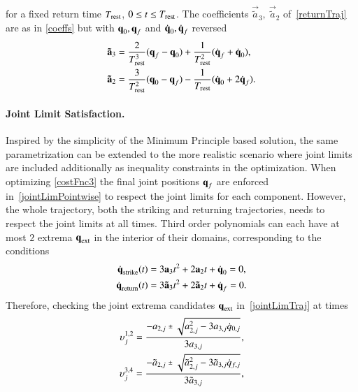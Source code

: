 %
\noindent for a fixed return time $T_{\mathrm{rest}}$, $0 \leq t \leq T_{\mathrm{rest}}$. The coefficients $\vec{\tilde{a}}_3, \  \vec{\tilde{a}}_2$ of~\eqref{returnTraj} are as in \eqref{coeffs} but with $\boldsymbol{\mathrm{q}}_0, \boldsymbol{\mathrm{q}}_f$ and $\dot{\boldsymbol{\mathrm{q}}}_0, \dot{\boldsymbol{\mathrm{q}}}_f$ reversed
%
\begin{align}
\boldsymbol{\mathrm{\tilde{a}}}_3 &= \frac{2}{T_{\mathrm{rest}}^3}(\boldsymbol{\mathrm{q}}_f - \boldsymbol{\mathrm{q}}_0) + \frac{1}{T_{\mathrm{rest}}^2}(\dot{\boldsymbol{\mathrm{q}}}_f + \dot{\boldsymbol{\mathrm{q}}}_0), \\
\boldsymbol{\mathrm{\tilde{a}}}_2 &= \frac{3}{T_{\mathrm{rest}}^2}(\boldsymbol{\mathrm{q}}_0 - \boldsymbol{\mathrm{q}}_f) - \frac{1}{T_{\mathrm{rest}}}(\dot{\boldsymbol{\mathrm{q}}}_0 + 2\dot{\boldsymbol{\mathrm{q}}}_f).
\label{returnCoeffs}
\end{align}
%
\paragraph{\textbf{Joint Limit Satisfaction}.} Inspired by the simplicity of the Minimum Principle based solution, the same parametrization can be extended to the more realistic scenario where joint limits are included additionally as inequality constraints in the optimization.
%
% 
%
When optimizing \eqref{costFnc3} the final joint positions $\boldsymbol{\mathrm{q}}_f$ are enforced in~\eqref{jointLimPointwise} to respect the joint limits for each component. However, the whole trajectory, both the striking and returning trajectories, needs to respect the joint limits at all times. Third order polynomials can each have at most $2$ extrema $\boldsymbol{\mathrm{q}}_{\mathrm{ext}}$ in the interior of their domains, corresponding to the conditions
%
\begin{align}
\dot{\boldsymbol{\mathrm{q}}}_{\mathrm{strike}}(t) &= 3\boldsymbol{\mathrm{a}}_3t^2 + 2\boldsymbol{\mathrm{a}}_2t + \dot{\boldsymbol{\mathrm{q}}}_0 = 0, \\
\dot{\boldsymbol{\mathrm{q}}}_{\mathrm{return}}(t) &= 3\boldsymbol{\mathrm{\tilde{a}}}_3t^2 + 2\boldsymbol{\mathrm{\tilde{a}}}_2t + \dot{\boldsymbol{\mathrm{q}}}_f = 0. 
\end{align}
%
\noindent Therefore, checking the joint extrema candidates  $\boldsymbol{\mathrm{q}}_{\mathrm{ext}}$ in~\eqref{jointLimTraj} at times
%
\begin{align}
\upsilon_{j}^{1,2} = \frac{-a_{2,j} \ \rpm \ \sqrt{a_{2,j}^2 - 3a_{3,j}\dot{q}_{0,j}}}{3a_{3,j}}, \\
\upsilon_{j}^{3,4} = \frac{-\tilde{a}_{2,j} \ \rpm \ \sqrt{\tilde{a}_{2,j}^2 - 3\tilde{a}_{3,j}\dot{q}_{f,j}}}{3\tilde{a}_{3,j}},
\label{jointPosExtrema}
\end{align}
